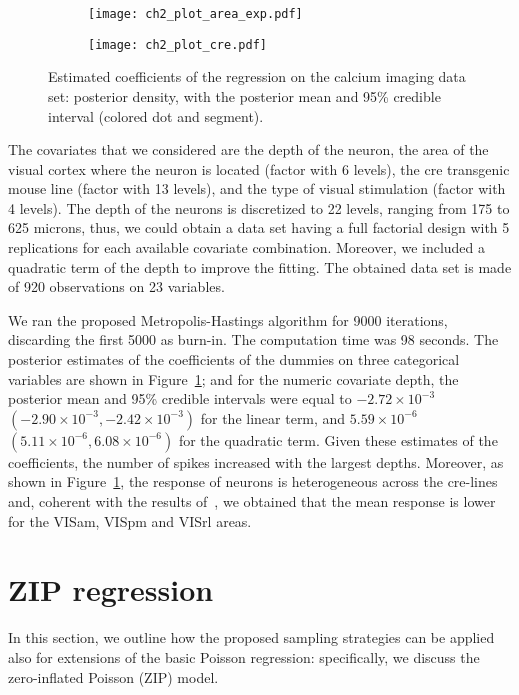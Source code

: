 \begin{figure}[t]
	\centering
	\begin{subfigure}{\linewidth} \centering
		\texttt{[image: ch2\_plot\_area\_exp.pdf]}
	\end{subfigure}
	\begin{subfigure}{\linewidth} \centering
		\texttt{[image: ch2\_plot\_cre.pdf]}   \end{subfigure}
	\caption[Estimated coefficients of the regression on the calcium imaging data set.]{Estimated coefficients of the regression on the calcium imaging data set: posterior density, with the posterior mean and 95\% credible interval (colored dot and segment).} \label{fig:calcium_coeff}
\end{figure}


The covariates that we considered are the depth of the neuron, the area of the visual cortex where the neuron is located (factor with 6 levels), the cre transgenic mouse line (factor with 13 levels), and the type of visual stimulation (factor with 4 levels). 
The depth of the neurons is discretized to 22 levels, ranging from 175 to 625 microns, thus, we could obtain a data set having a full factorial design with 5 replications for each available covariate combination. Moreover, we included a quadratic term of the depth to improve the fitting. The obtained data set is made of 920 observations on 23 variables.


We ran the proposed Metropolis-Hastings algorithm for 9000 iterations, discarding the first 5000 as burn-in. The computation time was 98 seconds.
The posterior estimates of the coefficients of the dummies on three categorical variables are shown in Figure~\ref{fig:calcium_coeff}; and for the numeric covariate depth, the posterior mean and 95\% credible intervals were equal to $-2.72\times 10^{-3}$ $(-2.90\times 10^{-3}, -2.42\times 10^{-3})$ for the linear term, and $5.59\times 10^{-6}$ $(5.11\times 10^{-6}, 6.08\times 10^{-6})$ for the quadratic term.
Given these estimates of the coefficients, the number of spikes increased with the largest depths.
Moreover, as shown in Figure~\ref{fig:calcium_coeff}, the response of neurons is heterogeneous across the cre-lines and, coherent with the results of~\textcite{vries2020}, we obtained that the mean response is lower for the VISam, VISpm and VISrl areas.

\section{ZIP regression}
In this section, we outline how the proposed sampling strategies can be applied also for extensions of the basic Poisson regression: specifically, we discuss the zero-inflated Poisson (ZIP) model.

